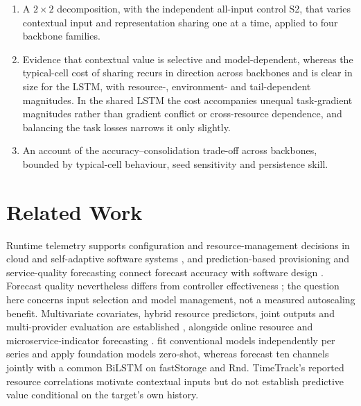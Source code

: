 \documentclass[5p,twocolumn]{elsarticle}
\begin{document}
\begin{enumerate}
  \item A $2\times2$ decomposition, with the independent all-input control
    S2, that varies contextual input and representation sharing one at a
    time, applied to four backbone families.
  \item Evidence that contextual value is selective and model-dependent,
    whereas the typical-cell cost of sharing recurs in direction across
    backbones and is clear in size for the LSTM, with
    resource-, environment- and tail-dependent magnitudes. In the shared LSTM
    the cost accompanies unequal task-gradient magnitudes rather than
    gradient conflict or cross-resource dependence, and balancing the task
    losses narrows it only slightly.
  \item An account of the accuracy--consolidation trade-off across
    backbones, bounded by typical-cell behaviour, seed sensitivity and
    persistence skill.
\end{enumerate}

\section{Related Work}
\label{sec:related-work}

Runtime telemetry supports configuration and resource-management decisions in
cloud and self-adaptive software systems
\citep{Taherizadeh2018Monitoring,Bauer2020SelfAware}, and prediction-based
provisioning and service-quality forecasting connect forecast accuracy with
software design \citep{Calheiros2015ARIMA,Syu2017DynamicQoS}. Forecast quality
nevertheless differs from controller effectiveness \citep{Qu2018Autoscaling};
the question here concerns input selection and model management, not a
measured autoscaling benefit. Multivariate covariates, hybrid resource
predictors, joint outputs and multi-provider evaluation are established
\citep{Tran2018MultivariateFuzzy,Xu2022esDNN,Tripathi2025MMRP,
Rossi2025CloudUncertainty,Zhang2025SWTCLSTM}, alongside online resource and
microservice-indicator forecasting \citep{Gao2026OMCR,Gao2026MaMiClif}.
\citet{DiMenna2026RuntimeForecasting} fit conventional models independently
per series and apply foundation models zero-shot, whereas
\citet{Ullah2023CloudBiLSTM} forecast ten channels jointly with a common
BiLSTM on fastStorage and Rnd. TimeTrack's reported resource correlations
\citep{Meliani2025TimeTrack} motivate contextual inputs but do not establish
predictive value conditional on the target's own history.
\end{document}
